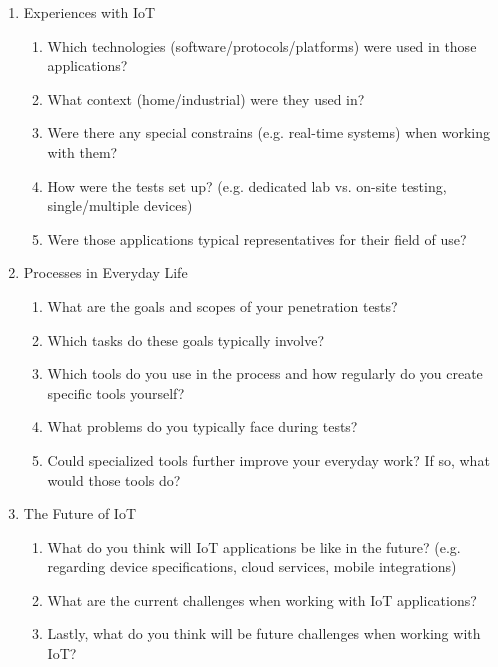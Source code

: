 \begin{enumerate}
    \item Experiences with IoT
          \begin{enumerate}\item Which technologies (software/protocols/platforms) were used in those applications?
              \item What context (home/industrial) were they used in?
              \item Were there any special constrains (e.g. real-time systems) when working with them?
              \item  How were the tests set up? (e.g. dedicated lab vs. on-site testing, single/multiple devices)
              \item Were those applications typical representatives for their field of use?
          \end{enumerate}
    \item   Processes in Everyday Life
          \begin{enumerate}\item  What are the goals and scopes of your penetration tests?
              \item  Which tasks do these goals typically involve?
              \item  Which tools do you use in the process and how regularly do you create specific tools yourself?
              \item  What problems do you typically face during tests?
              \item  Could specialized tools further improve your  everyday work? If so, what would those tools do?
          \end{enumerate}
    \item   The Future of IoT
          \begin{enumerate}\item  What do you think will IoT applications be like in the future? (e.g. regarding device specifications, cloud services, mobile integrations)
              \item What are the current challenges when working with IoT applications?
              \item  Lastly, what do you think will be future challenges when working with IoT?
          \end{enumerate}
\end{enumerate}